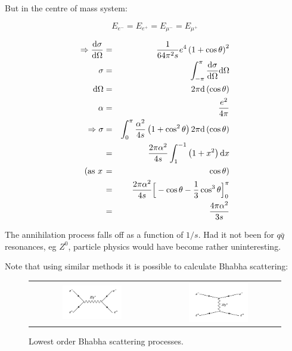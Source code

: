 But in the centre of mass system:

\[
  E_{e^-} = E_{e^+} = E_{\mu^-} = E_{\mu^+}
\]

\begin{eqnarray*}
  \Rightarrow \frac{\mathrm{d}\sigma}{\mathrm{d}\Omega} & = & \frac{1}{64\pi^2s}e^4\left(1 + \cos\theta\right)^2 \\
  \sigma & = & \int_{-\pi}^{\pi}\frac{\mathrm{d}\sigma}{\mathrm{d}\Omega}\mathrm{d}\Omega \\
  \mathrm{d}\Omega & = & 2\pi \mathrm{d}\left(\cos\theta\right) \\
  \alpha & = & \frac{e^2}{4\pi} \\
  \Rightarrow \sigma & = & \int_0^{\pi}\frac{\alpha^2}{4s}\left(1 + \cos^2\theta\right) 2\pi\mathrm{d}\left(\cos\theta\right) \\
  & = & \frac{2\pi\alpha^2}{4s}\int_{1}^{-1}\left(1 + x^2\right)\mathrm{d}x \\
  \left(\textrm{as } x \right.& = &\left. \cos\theta\right) \\
  & = & \frac{2\pi\alpha^2}{4s}\Big[-\cos\theta - \frac{1}{3}\cos^3\theta\Big]_0^{\pi} \\
  & = & \frac{4\pi\alpha^2}{3s}
\end{eqnarray*}

The annihilation process falls off as a function of $1/s$.  Had it not been for $q\bar{q}$ resonances, eg $Z^0$, particle physics would have become rather uninteresting.

Note that using similar methods it is possible to calculate Bhabha scattering:

\begin{figure}[!htb]
  \begin{center}
    \begin{tabular}{cc}
      \includegraphics[width=0.5\textwidth]{images/web_feynman/image_28.png} &
      \includegraphics[width=0.5\textwidth]{images/web_feynman/image_29.png}
    \end{tabular}
    \caption[Lowest order Bhabha scattering processes]{Lowest order Bhabha scattering processes.}
    \label{fig:ch8_Bhabha}
  \end{center}
\end{figure}

